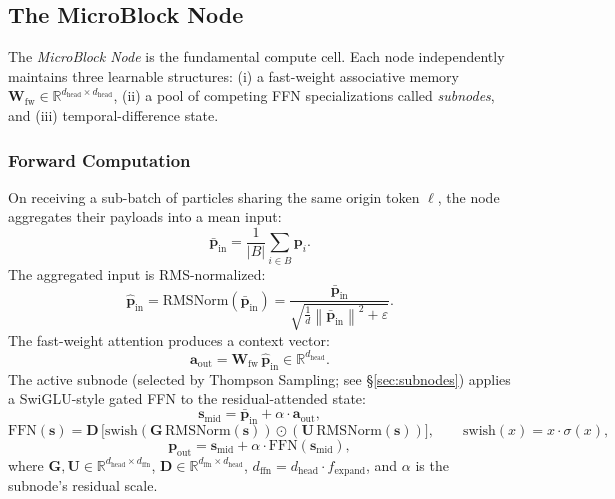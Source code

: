 \documentclass[11pt,a4paper]{article}
\theoremstyle{definition}
\newcommand{\vp}{\mathbf{p}}
\newcommand{\vs}{\mathbf{s}}
\newcommand{\va}{\mathbf{a}}
\newcommand{\mW}{\mathbf{W}}
\newcommand{\mG}{\mathbf{G}}
\newcommand{\mU}{\mathbf{U}}
\newcommand{\mD}{\mathbf{D}}
\newcommand{\R}{\mathbb{R}}
\newcommand{\norm}[1]{\left\lVert #1 \right\rVert}
\newcommand{\RMSNorm}{\mathrm{RMSNorm}}
\newcommand{\swish}{\mathrm{swish}}
\begin{document}
\subsection{The MicroBlock Node}
\label{sec:microblock}

The \emph{MicroBlock Node} is the fundamental compute cell.
Each node independently maintains three learnable structures: (i) a fast-weight associative memory
$\mW_\text{fw} \in \R^{d_\text{head} \times d_\text{head}}$, (ii) a pool of competing FFN
specializations called \emph{subnodes}, and (iii) temporal-difference state.

\subsubsection{Forward Computation}

On receiving a sub-batch of particles sharing the same origin token $\ell$,
the node aggregates their payloads into a mean input:
\begin{equation}
  \bar{\vp}_\text{in} = \frac{1}{|B|}\sum_{i \in B} \vp_i.
  \label{eq:aggregate}
\end{equation}
The aggregated input is RMS-normalized:
\begin{equation}
  \hat{\vp}_\text{in} = \RMSNorm(\bar{\vp}_\text{in})
    = \frac{\bar{\vp}_\text{in}}{\sqrt{\frac{1}{d}\norm{\bar{\vp}_\text{in}}^2 + \varepsilon}}.
  \label{eq:rmsnorm}
\end{equation}
The fast-weight attention produces a context vector:
\begin{equation}
  \va_\text{out} = \mW_\text{fw} \, \hat{\vp}_\text{in} \in \R^{d_\text{head}}.
  \label{eq:fwa}
\end{equation}
The active subnode (selected by Thompson Sampling; see \S\ref{sec:subnodes}) applies a
SwiGLU-style gated FFN to the residual-attended state:
\begin{equation}
  \vs_\text{mid} = \bar{\vp}_\text{in} + \alpha \cdot \va_\text{out},
  \label{eq:smid}
\end{equation}
\begin{equation}
  \text{FFN}(\vs) = \mD\,\bigl[\swish(\mG\,\RMSNorm(\vs)) \odot (\mU\,\RMSNorm(\vs))\bigr],
  \qquad \swish(x) = x \cdot \sigma(x),
  \label{eq:ffn}
\end{equation}
\begin{equation}
  \vp_\text{out} = \vs_\text{mid} + \alpha \cdot \text{FFN}(\vs_\text{mid}),
  \label{eq:pout}
\end{equation}
where $\mG, \mU \in \R^{d_\text{head} \times d_\text{ffn}}$,
$\mD \in \R^{d_\text{ffn} \times d_\text{head}}$, $d_\text{ffn} = d_\text{head} \cdot f_\text{expand}$,
and $\alpha$ is the subnode's residual scale.
\end{document}
